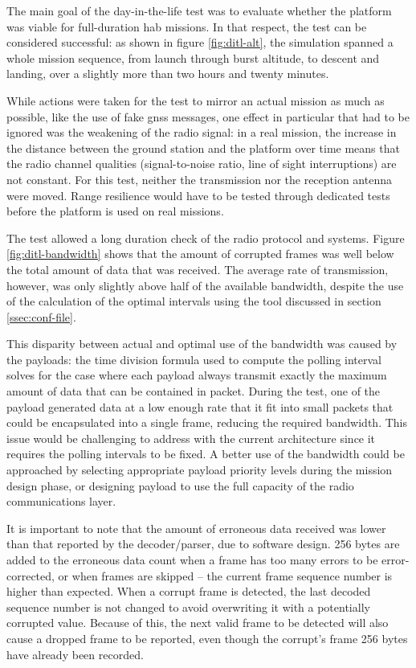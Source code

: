 The main goal of the day-in-the-life test was to evaluate whether the platform
was viable for full-duration \acrlong{hab} missions. In that respect, the test
can be considered successful: as shown in figure \ref{fig:ditl-alt}, the
simulation spanned a whole mission sequence, from launch through burst altitude,
to descent and landing, over a slightly more than two hours and twenty minutes.

While actions were taken for the test to mirror an actual mission as much as
possible, like the use of fake \acrshort{gnss} messages, one effect in
particular that had to be ignored was the weakening of the radio signal: in a
real mission, the increase in the distance between the ground station and the
platform over time means that the radio channel qualities (signal-to-noise
ratio, line of sight interruptions) are not constant. For this test, neither the
transmission nor the reception antenna were moved. Range resilience would have
to be tested through dedicated tests before the platform is used on real
missions.

The test allowed a long duration check of the radio protocol and systems. Figure
\ref{fig:ditl-bandwidth} shows that the amount of corrupted frames was well
below the total amount of data that was received. The average rate of
transmission, however, was only slightly above half of the available bandwidth,
despite the use of the calculation of the optimal intervals using the tool
discussed in section \ref{ssec:conf-file}.

This disparity between actual and optimal use of the bandwidth was caused by the payloads: the time division formula used to compute the polling interval solves for the case where each payload always transmit exactly the maximum amount of data that can be contained in packet. During the test, one of the payload generated data at a low enough rate that it fit into small packets that could be encapsulated into a single frame, reducing the required bandwidth. This issue would be challenging to address with the current architecture since it requires the polling intervals to be fixed. A better use of the bandwidth could be approached by selecting appropriate payload priority levels during the mission design phase, or designing payload to use the full capacity of the radio communications layer.

It is important to note that the amount of erroneous data received was lower
than that reported by the decoder/parser, due to software design. 256 bytes are
added to the erroneous data count when a frame has too many errors to be
error-corrected, or when frames are skipped – the current frame sequence number
is higher than expected. When a corrupt frame is detected, the last decoded
sequence number is not changed to avoid overwriting it with a potentially
corrupted value. Because of this, the next valid frame to be detected will
also cause a dropped frame to be reported, even though the corrupt's frame
256 bytes have already been recorded.

